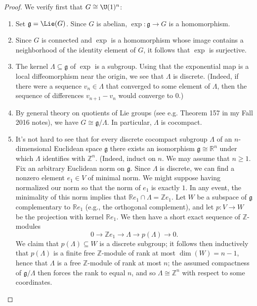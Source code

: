 \documentclass[reqno]{amsart} 
\begin{document}
\begin{proof}
  We verify first that $G \cong \U(1)^n$:
  \begin{enumerate}
  \item Set $\mathfrak{g} = \Lie(G)$.  Since $G$ is abelian, $\exp : \mathfrak{g} \rightarrow G$ is a homomorphism.
  \item Since $G$ is connected and $\exp$ is a homomorphism whose image contains a neighborhood of the identity element of $G$, it follows that $\exp$ is surjective.
  \item The kernel $\Lambda \subseteq \mathfrak{g}$ of $\exp$ is a subgroup.  Using that the exponential map is a local diffeomorphism near the origin, we see that $\Lambda$ is discrete.  (Indeed, if there were a sequence $v_n \in \Lambda$ that converged to some element of $\Lambda$, then the sequence of differences $v_{n+1} - v_n$ would converge to $0$.)
  \item By general theory on quotients of Lie groups (see e.g. Theorem 157 in my Fall 2016 notes), we have $G \cong \mathfrak{g}/\Lambda$.  In particular, $\Lambda$ is cocompact.
  \item It's not hard to see that for every discrete cocompact subgroup $\Lambda$ of an $n$-dimensional Euclidean space $\mathfrak{g}$ there exists an isomorphism $\mathfrak{g} \cong \mathbb{R}^n$ under which $\Lambda$ identifies with $\mathbb{Z}^n$.  (Indeed, induct on $n$.  We may assume that $n \geq 1$.  Fix an arbitrary Euclidean norm on $\mathfrak{g}$.  Since $\Lambda$ is discrete, we can find a nonzero element $e_1 \in V$ of minimal norm.  We might suppose having normalized our norm so that the norm of $e_1$ is exactly $1$.  In any event, the minimality of this norm implies that $\mathbb{R} e_1 \cap \Lambda = \mathbb{Z} e_1$.  Let $W$ be a subspace of $\mathfrak{g}$ complementary to $\mathbb{R} e_1$ (e.g., the orthogonal complement), and let $p : V \rightarrow W$ be the projection with kernel $\mathbb{R} e_1$.  We then have a short exact sequence of $\mathbb{Z}$-modules
    \begin{equation*}
0 \rightarrow \mathbb{Z} e_1 \rightarrow \Lambda \rightarrow p(\Lambda) \rightarrow 0.
\end{equation*}
 We claim that $p(\Lambda) \subseteq W$ is a discrete subgroup; it follows then inductively that $p(\Lambda)$ is a finite free $\mathbb{Z}$-module of rank at most $\dim(W) = n-1$, hence that $\Lambda$ is a free $\mathbb{Z}$-module of rank at most $n$; the assumed compactness of $\mathfrak{g}/\Lambda$ then forces the rank to equal $n$, and so $\Lambda \cong \mathbb{Z}^n$ with respect to some coordinates.


\end{enumerate}
\end{proof}
\end{document}
